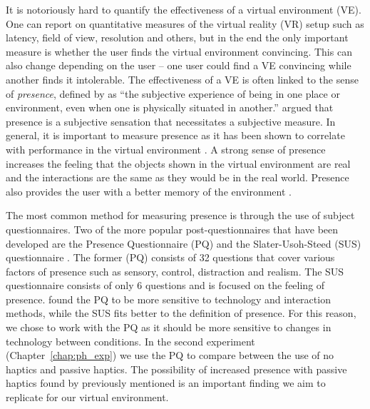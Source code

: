 It is notoriously hard to quantify the effectiveness of a virtual environment (VE).
One can report on quantitative measures of the virtual reality (VR) setup such as latency, field of view, resolution and others, but in the end the only important measure is whether the user finds the virtual environment convincing.
This can also change depending on the user -- one user could find a VE convincing while another finds it intolerable.
The effectiveness of a VE is often linked to the sense of \emph{presence}, defined by \citet{witmer_measuring_1998} as ``the subjective experience of being in one place or environment, even when one is physically situated in another.''
\citet{sheridan_musings_1992} argued that presence is a subjective sensation that necessitates a subjective measure.
In general, it is important to measure presence as it has been shown to correlate with performance in the virtual environment \citep{youngblut_relationship_2003}.
A strong sense of presence increases the feeling that the objects shown in the virtual environment are real and the interactions are the same as they would be in the real world.
Presence also provides the user with a better memory of the environment \citep{dinh_evaluating_1999}.

The most common method for measuring presence is through the use of subject questionnaires.
Two of the more popular post-questionnaires that have been developed are the Presence Questionnaire (PQ) \citep{witmer_measuring_1998} and the Slater-Usoh-Steed (SUS) questionnaire \citep{slater_depth_1994}.
The former (PQ) consists of 32 questions that cover various factors of presence such as sensory, control, distraction and realism.
The SUS questionnaire consists of only 6 questions and is focused on the feeling of presence.
\citet{nystad_comparison_2004} found the PQ to be more sensitive to technology and interaction methods, while the SUS fits better to the definition of presence.
For this reason, we chose to work with the PQ as it should be more sensitive to changes in technology between conditions.
In the second experiment (Chapter~\ref{chap:ph_exp}) we use the PQ to compare between the use of no haptics and passive haptics.
The possibility of increased presence with passive haptics found by \citet{insko_passive_2001} previously mentioned is an important finding we aim to replicate for our virtual environment.

